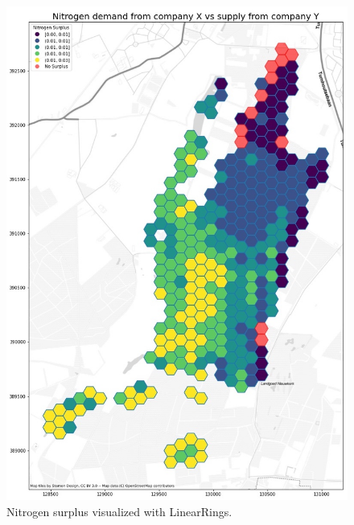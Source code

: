 \documentclass{article}
\begin{document}
\begin{figure}[ht]
    \centering
    \includegraphics[width=\textwidth, height=\textheight, keepaspectratio]{Nitro.jpg}
    \caption{Nitrogen surplus visualized with LinearRings.}
    \label{fig:nitrogenmap}
\end{figure}
\end{document}
